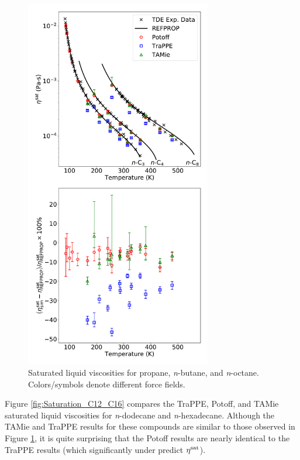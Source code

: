 \documentclass[preprint,review,12pt]{elsarticle}
\begin{document}
	\begin{figure}[p!]
		\centering
		\includegraphics[width=3.2in]{compare_force_fields_alkanes.pdf}
		\caption{Saturated liquid viscosities for propane, \textit{n}-butane, and \textit{n}-octane. Colors/symbols denote different force fields.}
		\label{fig:Saturation_C3_C4_C8}
	\end{figure} 
	
	Figure \ref{fig:Saturation_C12_C16} compares the TraPPE, Potoff, and TAMie saturated liquid viscosities for \textit{n}-dodecane and \textit{n}-hexadecane. Although the TAMie and TraPPE results for these compounds are similar to those observed in Figure \ref{fig:Saturation_C3_C4_C8}, it is quite surprising that the Potoff results are nearly identical to the TraPPE results (which significantly under predict $\eta^{\rm sat}$). 
	
\end{document}
